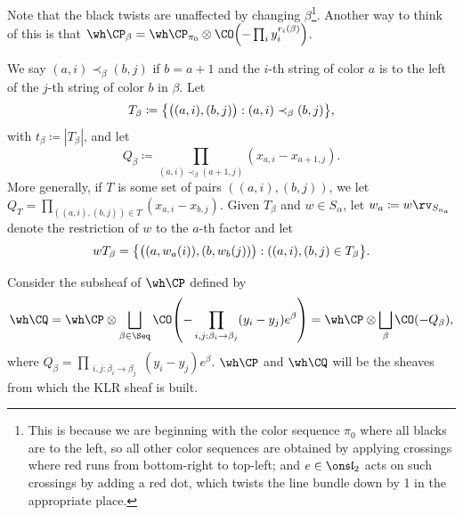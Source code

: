 \documentclass[11pt,reqno]{amsart}
\begin{document}
Note that the black twists are unaffected by changing $\beta$\footnote{This is because we are beginning with the color sequence $\pi_0$ where all blacks are to the left, so all other color sequences are obtained by applying crossings where red runs from bottom-right to top-left; and $e\in\sl_2$ acts on such crossings by adding a red dot, which twists the line bundle down by 1 in the appropriate place.}. Another way to think of this is that $\wh\CP_\beta=\wh\CP_{\pi_0}\otimes \CO\pr*{-\prod_i y_i^{r_i(\beta)}}$.

We say $(a,i)\prec_\beta (b,j)$ if $b=a+1$ and the $i$-th string of color $a$ is to the left of the $j$-th string of color $b$ in $\beta$. Let
\[T_\beta\coloneqq \set*{\big( (a,i),(b,j)\big):(a,i)\prec_\beta (b,j)},\] 
with $t_\beta\coloneqq |T_\beta|$, and let
\[Q_\beta\coloneqq \prod_{(a,i)\prec_\beta (a+1,j) } (x_{a,i}-x_{a+1,j}).\] 
More generally, if $T$ is some set of pairs $((a,i),(b,j))$, we let $Q_T=\prod_{((a,i),(b,j))\in T}(x_{a,i}-x_{b,j})$. Given $T_\beta$ and $w\in S_\alpha$, let $w_a\coloneqq w\rv_{S_{n_a}}$ denote the restriction of $w$ to the $a$-th factor and let
\[wT_\beta=\set*{ \big((a,w_a(i)),(b,w_b(j))\big): ((a,i),(b,j)\in T_\beta  }.\]

Consider the subsheaf of $\wh\CP$ defined by 
\[\wh\CQ=\wh\CP\otimes \bigsqcup_{\beta\in\Seq}\CO\pr*{-\prod_{\substack{ i,j:\beta_i\to \beta_j}}(y_i-y_j)e^\beta}=\wh\CP\otimes\bigsqcup_\beta \CO(-Q_\beta ),\] 
where $Q_\beta =\prod_{\substack{ i,j:\beta_i\to \beta_j}}(y_i-y_j)e^\beta$. $\wh\CP$ and $\wh\CQ$ will be the sheaves from which the KLR sheaf is built.
\end{document}

